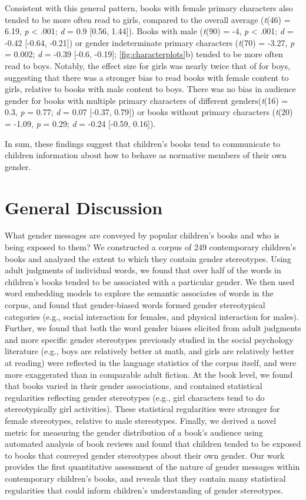 \documentclass[english,,man,floatsintext]{apa6}
\begin{document}
Consistent with this general pattern, books with female primary characters also tended to be more often read to girls, compared to the overall average (\emph{t}(46) = 6.19, \emph{p} \textless{} .001; \emph{d} = 0.9 {[}0.56, 1.44{]}). Books with male (\emph{t}(90) = -4, \emph{p} \textless{} .001; \emph{d} = -0.42 {[}-0.64, -0.21{]}) or gender indeterminate primary characters (\emph{t}(70) = -3.27, \emph{p} = 0.002; \emph{d} = -0.39 {[}-0.6, -0.19{]}; \autoref{fig:characterplots}b) tended to be more often read to boys. Notably, the effect size for girls was nearly twice that of for boys, suggesting that there was a stronger bias to read books with female content to girls, relative to books with male content to boys. There was no bias in audience gender for books with multiple primary characters of different genders(\emph{t}(16) = 0.3, \emph{p} = 0.77; \emph{d} = 0.07 {[}-0.37, 0.79{]}) or books without primary characters (\emph{t}(20) = -1.09, \emph{p} = 0.29; \emph{d} = -0.24 {[}-0.59, 0.16{]}).

In sum, these findings suggest that children's books tend to communicate to children information about how to behave as normative members of their own gender.

\hypertarget{general-discussion}{%
\section{General Discussion}\label{general-discussion}}

What gender messages are conveyed by popular children's books and who is being exposed to them? We constructed a corpus of 249 contemporary children's books and analyzed the extent to which they contain gender stereotypes. Using adult judgments of individual words, we found that over half of the words in children's books tended to be associated with a particular gender. We then used word embedding models to explore the semantic associates of words in the corpus, and found that gender-biased words formed gender stereotypical categories (e.g., social interaction for females, and physical interaction for males). Further, we found that both the word gender biases elicited from adult judgments and more specific gender stereotypes previously studied in the social psychology literature (e.g., boys are relatively better at math, and girls are relatively better at reading) were reflected in the language statistics of the corpus itself, and were more exaggerated than in comparable adult fiction. At the book level, we found that books varied in their gender associations, and contained statistical regularities reflecting gender stereotypes (e.g., girl characters tend to do stereotypically girl activities). These statistical regularities were stronger for female stereotypes, relative to male stereotypes. Finally, we derived a novel metric for measuring the gender distribution of a book's audience using automated analysis of book reviews and found that children tended to be exposed to books that conveyed gender stereotypes about their own gender. Our work provides the first quantitative assessment of the nature of gender messages within contemporary children's books, and reveals that they contain many statistical regularities that could inform children's understanding of gender stereotypes.
\end{document}

